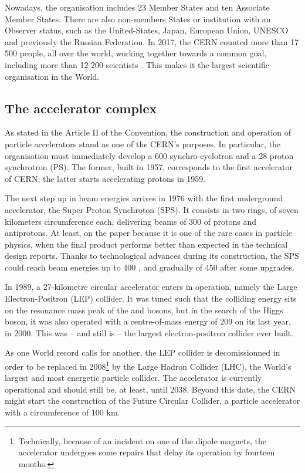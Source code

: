 Nowadays, the organisation includes 23 Member States and ten Associate Member States. There are also non-members States or institution with an Observer status, such as the United-States, Japan, European Union, UNESCO and previously the Russian Federation. In 2017, the CERN counted more than 17 500 people, all over the world, working together towards a common goal, including more than 12 200 scientists \cite{cernOurPeople2023}. This makes it the largest scientific organisation in the World.

\subsection{The accelerator complex}
\label{subsec:AcceleratorComplex}

As stated in the Article II of the Convention, the construction and operation of particle accelerators stand as one of the CERN's purposes. In particular, the organisation must immediately develop a 600 \mev synchro-cyclotron and a 28 \gev proton synchrotron (PS). The former, built in 1957, corresponds to the first accelerator of CERN; the latter starts accelerating protons in 1959.

The next step up in beam energies arrives in 1976 with the first underground accelerator, the Super Proton Synchroton (SPS). It consists in two rings, of seven kilometers circumference each, delivering beams of 300 \gev of protons and antiprotons. At least, on the paper because it is one of the rare cases in particle physics, when the final product performs better than expected in the technical design reports. Thanks to technological advances during its construction, the SPS could reach beam energies up to 400 \gev, and gradually of 450 \gev after some upgrades.

In 1989, a 27-kilometre circular accelerator enters in operation, namely the Large Electron-Positron (LEP) collider. It was tuned such that the colliding energy sits on the resonance mass peak of the \rmZzero and \rmWplusminus bosons, but in the search of the Higgs boson, it was also operated with a centre-of-mass energy of 209 \gev on its last year, in 2000. This was -- and still is -- the largest electron-positron collider ever built.

As one World record calls for another, the LEP collider is decomissionned in order to be replaced in 2008\footnote{Technically, because of an incident on one of the dipole magnets, the accelerator undergoes some repairs that delay its operation by fourteen months.} by the Large Hadron Collider (LHC), the World's largest and most energetic particle collider. The accelerator is currently operational and should still be, at least, until 2038. Beyond this date, the CERN might start the construction of the Future Circular Collider, a particle accelerator with a circumference of 100 km\cite{FutureCircularCollider2023}\cite{benediktFutureCircularCollider2019}.\\

